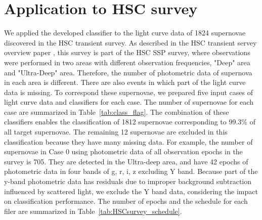 \documentclass[useamsfonts]{pasj01}
\begin{document}
\section{Application to HSC survey}
\label{sec:h}
%
We applied the developed classifier to the light curve data of 1824 supernovae discovered in the HSC transient survey.
As described in the HSC transient servey overview paper \citep{yasuda19a}, this survey is part of the HSC SSP survey, where observations were performed in two areas with different observation frequencies, "Deep" area and "Ultra-Deep" area.
Therefore, the number of photometric data of supernova in each area is different.
There are also events in which part of the light curve data is missing.
To correspond these supernovae, we prepared five input cases of light curve data and classifiers for each case.
The number of supernovae for each case are summarized in Table\ \ref{tab:class_flag}.
The combination of these classifiers enables the classification of 1812 supernovae corresponding to 99.3\% of all target supernovae.
The remaining 12 supernovae are excluded in this classification because they have many missing data.
For example, the number of supernovae in Case 0 using photometric data of all observation epochs in the survey is 705.
They are detected in the Ultra-deep area, and have 42 epochs of photometric data in four bands of g, r, i, z excluding Y band.
Because part of the y-band photometric data has residuals due to improper background subtraction influenced by scattered light,
we exclude the Y band data, considering the impact on classification performance.
The number of epochs and the schedule for each filer are summarized in Table\ \ref{tab:HSCsurvey_schedule}.
%
\begin{table}[ht]
\label{tab:class_flag}
\end{table}
\end{document}
